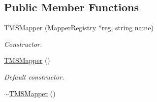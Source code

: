 \subsection*{Public Member Functions}
\begin{DoxyCompactItemize}
\item 
\hyperlink{classTMSMapper_aacd67bc9f88731c8b071c68c152b3650}{TMSMapper} (\hyperlink{classMapperRegistry}{MapperRegistry} $\ast$reg, string name)
\begin{DoxyCompactList}\small\item\em Constructor. \item\end{DoxyCompactList}\item 
\hypertarget{classTMSMapper_a7976c2a848d5abf1518ad21fa10af2d8}{
\hyperlink{classTMSMapper_a7976c2a848d5abf1518ad21fa10af2d8}{TMSMapper} ()}
\label{classTMSMapper_a7976c2a848d5abf1518ad21fa10af2d8}

\begin{DoxyCompactList}\small\item\em Default constructor. \item\end{DoxyCompactList}\item 
\hypertarget{classTMSMapper_acf66d6e1380c809db1889a973d903449}{
\hyperlink{classTMSMapper_acf66d6e1380c809db1889a973d903449}{$\sim$TMSMapper} ()}
\label{classTMSMapper_acf66d6e1380c809db1889a973d903449}


\end{DoxyCompactItemize}
